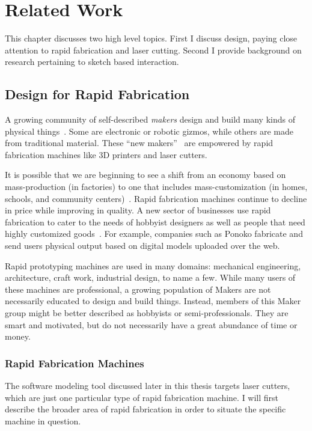 \chapter{Related Work}
\label{sec:rw}

This chapter discusses two high level topics. First I discuss design,
paying close attention to rapid fabrication and laser cutting. Second
I provide background on research pertaining to sketch based interaction.

\section{Design for Rapid Fabrication}

A growing community of self-described \textit{makers} design and build
many kinds of physical things~\cite{gershenfeld-fab}. Some are
electronic or robotic gizmos, while others are made from traditional
material. These ``new makers''~\cite{gross-new-makers} are empowered
by rapid fabrication machines like 3D printers and laser cutters.

It is possible that we are beginning to see a shift from an economy
based on mass-production (in factories) to one that includes
mass-customization (in homes, schools, and community
centers)~\cite{economist-fab}. Rapid fabrication machines continue to
decline in price while improving in quality. A new sector of
businesses use rapid fabrication to cater to the needs of hobbyist
designers as well as people that need highly customized
goods~\cite{paulos-citizenscience}. For example, companies such as
Ponoko fabricate and send users physical output based on digital
models uploaded over the web.

Rapid prototyping machines are used in many domains: mechanical
engineering, architecture, craft work, industrial design, to name a
few. While many users of these machines are professional, a growing
population of Makers are not necessarily educated to design and build
things. Instead, members of this Maker group might be better described
as hobbyists or semi-professionals. They are smart and motivated, but
do not necessarily have a great abundance of time or money.

\subsection{Rapid Fabrication Machines}

The software modeling tool discussed later in this thesis targets
laser cutters, which are just one particular type of rapid fabrication
machine. I will first describe the broader area of rapid fabrication
in order to situate the specific machine in question.

